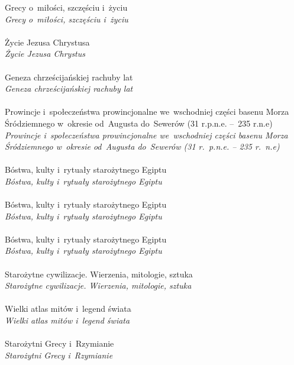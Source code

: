 \documentclass[a4paper,11pt]{article}
\begin{document}
\Jest  Grecy o~miłości, szczęściu i~życiu \\
\Powin \textit{Grecy o~miłości, szczęściu i~życiu} \\
 \\
\Jest  Życie Jezusa Chrystusa \\
\Powin \textit{Życie Jezusa Chrystus} \\
 \\
\Jest  Geneza chrześcijańskiej rachuby lat \\
\Powin \textit{Geneza chrześcijańskiej rachuby lat} \\
 \\
\Jest  Prowincje i~społeczeństwa prowincjonalne we~wschodniej części
basenu Morza Śródziemnego w~okresie od~Augusta do~Sewerów
(31 r.p.n.e. --~235 r.n.e) \\
\Powin \textit{Prowincje i~społeczeństwa prowincjonalne we~wschodniej
  części basenu Morza Śródziemnego w~okresie od~Augusta do~Sewerów
  (31 r.~p.n.e. -- 235 r.~n.e)} \\
 \\
\Jest  Bóstwa, kulty i~rytuały starożytnego Egiptu \\
\Powin \textit{Bóstwa, kulty i~rytuały starożytnego Egiptu} \\
 \\
\Jest  Bóstwa, kulty i~rytuały starożytnego Egiptu \\
\Powin \textit{Bóstwa, kulty i~rytuały starożytnego Egiptu} \\
 \\
\Jest  Bóstwa, kulty i~rytuały starożytnego Egiptu \\
\Powin \textit{Bóstwa, kulty i~rytuały starożytnego Egiptu} \\
 \\
\Jest  Starożytne cywilizacje. Wierzenia, mitologie, sztuka \\
\Powin \textit{Starożytne cywilizacje. Wierzenia, mitologie, sztuka} \\
 \\
\Jest  Wielki atlas mitów i~legend świata \\
\Powin \textit{Wielki atlas mitów i~legend świata} \\
 \\
\Jest  Starożytni Grecy i~Rzymianie \\
\Powin \textit{Starożytni Grecy i~Rzymianie} \\
\end{document}
